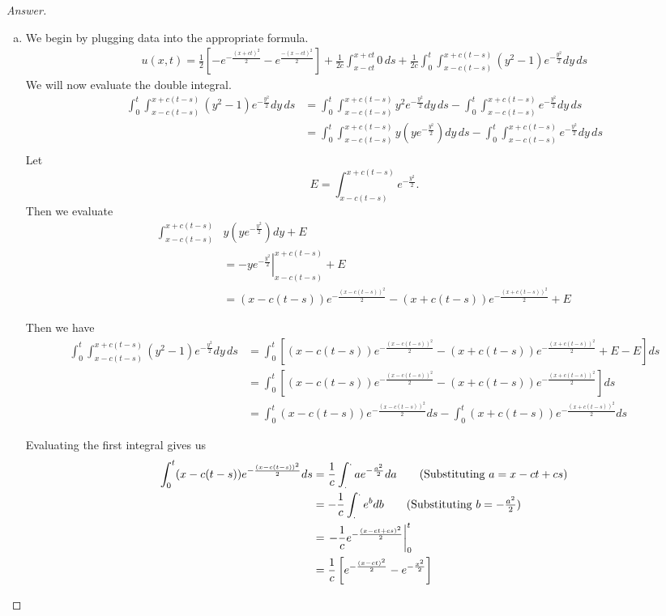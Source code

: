 \documentclass{article}
\theoremstyle{definition}
\renewcommand\qedsymbol{$\blacksquare$}
\newenvironment{ans}{\begin{proof}[Answer]\renewcommand{\qedsymbol}{}}{\end{proof}}
\begin{document}
    \begin{ans}
    \begin{enumerate}[a)]
        \item We begin by plugging data into the appropriate formula.
        \begin{align*}
            u(x,t) = \frac{1}{2}\left[-e^{-\frac{(x+ct)^2}{2}} -e^{\frac{-(x-ct)^2}{2}}\right] + \frac{1}{2c}\int_{x-ct}^{x+ct}0\,ds + \frac{1}{2c}\int_0^t\int_{x-c(t-s)}^{x+c(t-s)}(y^2-1)e^{-\frac{y^2}{2}}dy\,ds
        \end{align*}
        We will now evaluate the double integral.
        \begin{align*}
            \int_0^t\int_{x-c(t-s)}^{x+c(t-s)}(y^2-1)e^{-\frac{y^2}{2}}dy\,ds &= \int_0^t\int_{x-c(t-s)}^{x+c(t-s)}y^2e^{-\frac{y^2}{2}}dy\,ds - \int_0^t\int_{x-c(t-s)}^{x+c(t-s)}e^{-\frac{y^2}{2}}dy\,ds\\
            &= \int_0^t\int_{x-c(t-s)}^{x+c(t-s)}y\left(ye^{-\frac{y^2}{2}}\right)dy\,ds - \int_0^t\int_{x-c(t-s)}^{x+c(t-s)}e^{-\frac{y^2}{2}}dy\,ds\\
        \end{align*}
        Let $$E = \int_{x-c(t-s)}^{x+c(t-s)}e^{-\frac{y^2}{2}}.$$
        Then we evaluate
        \begin{align*}
            \int_{x-c(t-s)}^{x+c(t-s)}&y\left(ye^{-\frac{y^2}{2}}\right)dy + E\\
            &= \left.-ye^{-\frac{y^2}{2}}\right|^{x+c(t-s)}_{x-c(t-s)} + E\\
            &=(x-c(t-s))e^{-\frac{(x-c(t-s))^2}{2}} -(x+c(t-s))e^{-\frac{(x+c(t-s))^2}{2}} + E
        \end{align*}

        Then we have
        \begin{align*}
            \int_0^t\int_{x-c(t-s)}^{x+c(t-s)}(y^2-1)e^{-\frac{y^2}{2}}dy\,ds &=\int_0^t\left[(x-c(t-s))e^{-\frac{(x-c(t-s))^2}{2}} -(x+c(t-s))e^{-\frac{(x+c(t-s))^2}{2}} + E - E\right]ds\\
            &=\int_0^t\left[(x-c(t-s))e^{-\frac{(x-c(t-s))^2}{2}} -(x+c(t-s))e^{-\frac{(x+c(t-s))^2}{2}}\right]ds\\
            &=\int_0^t(x-c(t-s))e^{-\frac{(x-c(t-s))^2}{2}}ds -\int_0^t(x+c(t-s))e^{-\frac{(x+c(t-s))^2}{2}}ds
        \end{align*}
        
        Evaluating the first integral gives us
        \begin{align*}
            \int_0^t(x-c(t-s))e^{-\frac{(x-c(t-s))^2}{2}}ds &= \frac{1}{c} \int_.^. ae^{-\frac{a^2}{2}}da \tag{Substituting $a=x-ct+cs$}\\
            &= -\frac{1}{c} \int_.^. e^{b}db \tag{Substituting $b = -\frac{a^2}{2}$}\\
            &= \left.-\frac{1}{c}e^{-\frac{(x-ct+cs)^2}{2}}\right|_0^t\\
            &= \frac{1}{c}\left[e^{-\frac{(x-ct)^2}{2}} - e^{-\frac{x^2}{2}}\right]
        \end{align*}


\end{enumerate}
\end{ans}
\end{document}
